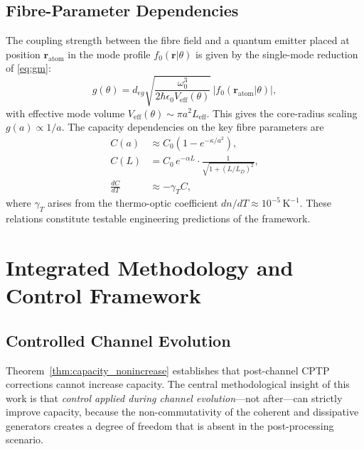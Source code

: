 \documentclass[journal,twocolumn]{IEEEtran}
\theoremstyle{definition}
\theoremstyle{plain}
\begin{document}
\subsection{Fibre-Parameter Dependencies}

The coupling strength between the fibre field and a quantum emitter
placed at position $\mathbf{r}_{\mathrm{atom}}$ in the mode profile
$f_0(\mathbf{r}|\theta)$ is given by the single-mode reduction of
\eqref{eq:gm}:
\begin{equation}
  g(\theta) = d_{eg}\sqrt{\frac{\omega_0^3}
    {2\hbar\epsilon_0 V_{\mathrm{eff}}(\theta)}}\,
  \bigl|f_0(\mathbf{r}_{\mathrm{atom}}|\theta)\bigr|,
  \label{eq:coupling}
\end{equation}
with effective mode volume $V_{\mathrm{eff}}(\theta) \sim \pi
a^2 L_{\mathrm{eff}}$.  This gives the core-radius scaling
$g(a) \propto 1/a$.  The capacity dependencies on the key fibre
parameters are
\begin{align}
  C(a) &\approx C_0\!\left(1 - e^{-\kappa/a^2}\right), \label{eq:Ca}\\
  C(L) &= C_0\, e^{-\alpha L} \cdot
    \frac{1}{\sqrt{1+(L/L_D)^2}}, \label{eq:CL}\\
  \frac{dC}{dT} &\approx -\gamma_T C, \label{eq:CT}
\end{align}
where $\gamma_T$ arises from the thermo-optic coefficient
$dn/dT \approx 10^{-5}\,\mathrm{K}^{-1}$.  These relations
constitute testable engineering predictions of the framework.

\section{Integrated Methodology and Control Framework}
\label{sec:methodology}

\subsection{Controlled Channel Evolution}

Theorem~\ref{thm:capacity_nonincrease} establishes that
post-channel CPTP corrections cannot increase capacity.  The central
methodological insight of this work is that \emph{control applied
during channel evolution}---not after---can strictly improve
capacity, because the non-commutativity of the coherent and
dissipative generators creates a degree of freedom that is absent in
the post-processing scenario.
\end{document}
